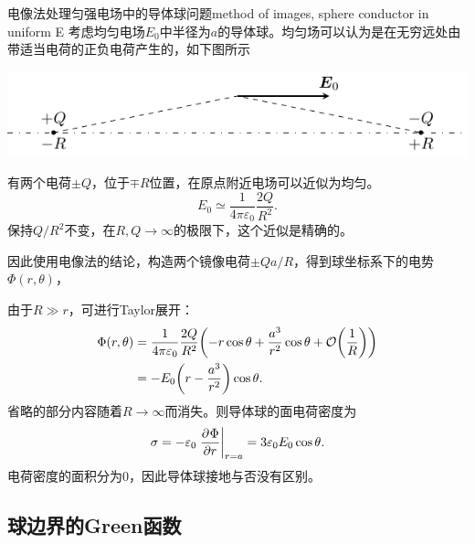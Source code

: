 \begin{example}{电像法处理匀强电场中的导体球问题}{method of images, sphere conductor in uniform E}
    考虑均匀电场$E_0$中半径为$a$的导体球。均匀场可以认为是在无穷远处由带适当电荷的正负电荷产生的，如下图所示
    \begin{center}
        \includegraphics{graphs/uniform_E_approx.pdf}
        \label{fig:uniform E approx +-q}
    \end{center}
    有两个电荷$\pm Q$，位于$\mp R$位置，在原点附近电场可以近似为均匀。
    \[
        E_0\simeq\frac1{4\pi\varepsilon_0}\frac{2Q}{R^2}.
    \]
    保持$Q/R^2$不变，在$R,Q\to\infty$的极限下，这个近似是精确的。

    因此使用电像法的结论，构造两个镜像电荷$\pm Qa/R$，得到球坐标系下的电势$\Phi(r,\theta)$，

    由于$R\gg r$，可进行Taylor展开：
    \begin{align}
        \notag
        \Phi(r,\theta)&=\frac1{4\pi\varepsilon_0}\frac{2Q}{R^2}\biggl(-r\cos\theta+\frac{a^3}{r^2}\cos\theta+\mathcal O\biggl(\frac1R\biggr)\biggr)\\
        &=-E_0\biggl(r-\frac{a^3}{r^2}\biggr)\cos\theta.
    \end{align}
    省略的部分内容随着$R\to\infty$而消失。则导体球的面电荷密度为
    \begin{equation}
        \sigma=-\varepsilon_0\left.\frac{\partial^{{}}\Phi}{\partial{r}^{{}}}\right\rvert_{r=a}=3\varepsilon_0E_0\cos\theta.
    \end{equation}
    电荷密度的面积分为0，因此导体球接地与否没有区别。
\end{example}

\subsection{球边界的Green函数}
\label{ssec:Green function, sphere}

